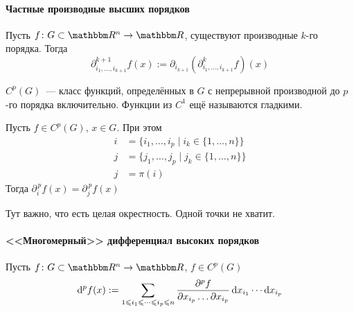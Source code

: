 \documentclass[12pt,trimbord]{../../../notes}
\begin{document}
\paragraph{Частные производные высших порядков}
\label{par:diffspace::highpartial}

\begin{defn}\label{defn:diffspace::highpartial}
  Пусть $f \colon G \subset \R^n \to \R$, существуют производные $k$-го порядка. Тогда
  \[
    \partial_{i_1, \dotsc, i_{k+1}}^{k+1} f(x) := \partial_{i_{k+1}}(\partial^k_{i_1, \dotsc, i_{k+1}} f) (x)
  \]
\end{defn}
\begin{rem}\label{rem:diffspace::highpartial::smooth}
  $C^p(G)$~--- класс функций, определённых в $G$ с непрерывной производной до $p$-го порядка
  включительно.
  Функции из $C^1$ ещё называются гладкими.
\end{rem}

\begin{thrm}
  \label{thrm:diffspace::highpartial::permut}
  Пусть \mbox{$f \in C^p(G)$}, $x\in G$. При этом
  \[
    \begin{split}
      i &= \{ i_1, \dotsc, i_p \mid i_k \in \{1, \dotsc, n\}\} \\
      j &= \{ j_1, \dotsc, j_p \mid j_k \in \{1, \dotsc, n\}\} \\
      j &= \pi(i)
    \end{split}
  \]
  Тогда 
  $\partial_i^{\,p} f(x) = \partial_j^{\,p} f(x)$
\end{thrm}
\begin{rem}\label{rem:diffspace::highpartial::permut}
  Тут важно, что есть целая окрестность. Одной точки не хватит.
\end{rem}

\paragraph{<<Многомерный>> дифференциал высоких порядков}
\label{par:diffspace::highdiff}

\begin{defn}\label{defn:diffspace::highdiff}
  Пусть $f \colon G \subset \R^n \to \R$, $f\in C^p(G)$
  \[  
    \mathrm{d}^p f(x) := \sum_{1 \leqslant i_1 \leqslant \dotsb \leqslant i_p \leqslant n}
    \frac{\partial^p f}{\partial x_{i_p} \dotso \partial x_{i_p}} \, \mathrm{d} x_{i_1} \dotsm \mathrm{d} x_{i_p}
  \]
\end{defn}
\end{document}
